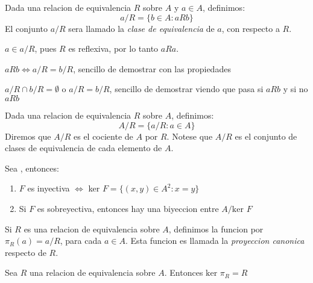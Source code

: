 \begin{definition}
  Dada una relacion de equivalencia $R$ sobre $A$ y $a \in A$, definimos:
  $$
  a / R = \{b \in A: aRb\}
  $$
  El conjunto $a/R$ sera llamado la \emph{clase de equivalencia} de $a$, con respecto a $R$.
\end{definition}

\begin{remark}
  $a \in a/R$, pues $R$ es reflexiva, por lo tanto $aRa$.
\end{remark}
\begin{remark}
  $aRb \iff a/R = b/R$, sencillo de demostrar con las
  propiedades
\end{remark}
\begin{remark}
  $a/R \cap b/R = \emptyset$ o $a/R = b/R$, sencillo de demostrar
  viendo que pasa si $aRb$ y si no $aRb$
\end{remark}

\begin{definition}
  Dada una relacion de equivalencia $R$ sobre $A$, definimos:
  $$
  A/R = \{a/R : a \in A\}
  $$
  Diremos que $A/R$ es el cociente de $A$ por $R$. Notese que $A/R$ es el conjunto de clases de equivalencia
  de cada elemento de $A$.
\end{definition}

\begin{remark}
  Sea , entonces:
  \begin{enumerate}
    \item $F$ es inyectiva $\iff$ ker $F = \{(x, y) \in A^2 : x = y\}$
    \item Si $F$ es sobreyectiva, entonces hay una biyeccion entre $A/\text{ker }F$
  \end{enumerate}
\end{remark}

\begin{definition}
  Si $R$ es una relacion de equivalencia sobre $A$, definimos la funcion  por $\pi_R(a) = a/R$, para cada $a \in A$.
  Esta funcion es llamada la \emph{proyeccion canonica} respecto de $R$.
\end{definition}

\begin{remark}
  Sea $R$ una relacion de equivalencia sobre $A$. Entonces ${\text{ker } \pi_R = R}$
\end{remark}

